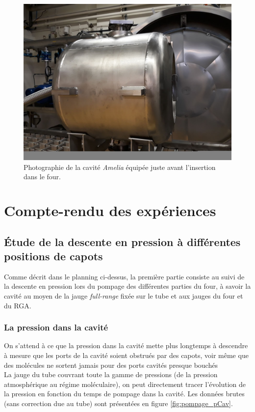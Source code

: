 \begin{figure}
    \centering
    \includegraphics[width = \textwidth]{Figures/IMG-20180410-WA0018.jpg}
        \caption{Photographie de la cavité \textit{Amelia} équipée juste avant l'insertion dans le four.}
    \label{fig:cavEquipee}
\end{figure}

\chapter{Compte-rendu des expériences}
\section{Étude de la descente en pression à différentes positions de capots}
Comme décrit dans le planning ci-dessus, la première partie consiste au suivi de la descente en pression lors du pompage des différentes parties du four, à savoir la cavité au moyen de la jauge \textit{full-range} fixée sur le tube et aux jauges du four et du RGA.
\subsection{La pression dans la cavité}
On s'attend à ce que la pression dans la cavité mette plus longtemps à descendre à mesure que les ports de la cavité soient obstrués par des capots, voir même que des molécules ne sortent jamais pour des ports cavités presque bouchés\\
La jauge du tube couvrant toute la gamme de pressions (de la pression atmosphérique au régime moléculaire), on peut directement tracer l'évolution de la pression en fonction du temps de pompage dans la cavité. Les données brutes (sans correction due au tube) sont présentées en figure \ref{fig:pompage_pCav}.

